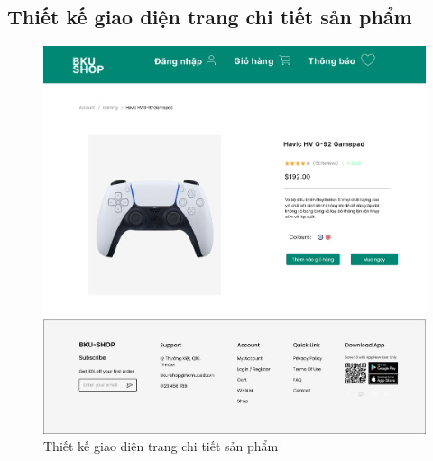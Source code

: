 \subsection {Thiết kế giao diện trang chi tiết sản phẩm}
\begin{figure}[H]
    \begin{center}
    \includegraphics[scale=0.2]{images/hieu/chap-4/product-detail.jpg}
    \vspace*{5mm}
    \caption{Thiết kế giao diện trang chi tiết sản phẩm}
    \end{center}
\end{figure}
